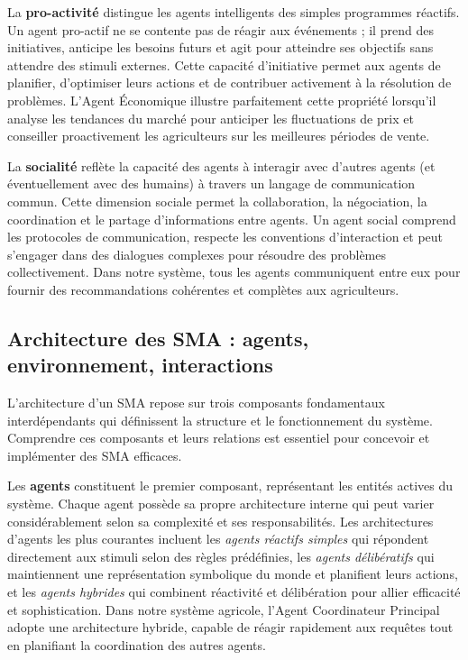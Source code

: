 La \textbf{pro-activité} distingue les agents intelligents des simples programmes réactifs. Un agent pro-actif ne se contente pas de réagir aux événements ; il prend des initiatives, anticipe les besoins futurs et agit pour atteindre ses objectifs sans attendre des stimuli externes. Cette capacité d'initiative permet aux agents de planifier, d'optimiser leurs actions et de contribuer activement à la résolution de problèmes. L'Agent Économique illustre parfaitement cette propriété lorsqu'il analyse les tendances du marché pour anticiper les fluctuations de prix et conseiller proactivement les agriculteurs sur les meilleures périodes de vente.

La \textbf{socialité} reflète la capacité des agents à interagir avec d'autres agents (et éventuellement avec des humains) à travers un langage de communication commun. Cette dimension sociale permet la collaboration, la négociation, la coordination et le partage d'informations entre agents. Un agent social comprend les protocoles de communication, respecte les conventions d'interaction et peut s'engager dans des dialogues complexes pour résoudre des problèmes collectivement. Dans notre système, tous les agents communiquent entre eux pour fournir des recommandations cohérentes et complètes aux agriculteurs.

\subsection{Architecture des SMA : agents, environnement, interactions}

L'architecture d'un SMA repose sur trois composants fondamentaux interdépendants qui définissent la structure et le fonctionnement du système. Comprendre ces composants et leurs relations est essentiel pour concevoir et implémenter des SMA efficaces.

Les \textbf{agents} constituent le premier composant, représentant les entités actives du système. Chaque agent possède sa propre architecture interne qui peut varier considérablement selon sa complexité et ses responsabilités. Les architectures d'agents les plus courantes incluent les \emph{agents réactifs simples} qui répondent directement aux stimuli selon des règles prédéfinies, les \emph{agents délibératifs} qui maintiennent une représentation symbolique du monde et planifient leurs actions, et les \emph{agents hybrides} qui combinent réactivité et délibération pour allier efficacité et sophistication. Dans notre système agricole, l'Agent Coordinateur Principal adopte une architecture hybride, capable de réagir rapidement aux requêtes tout en planifiant la coordination des autres agents.

